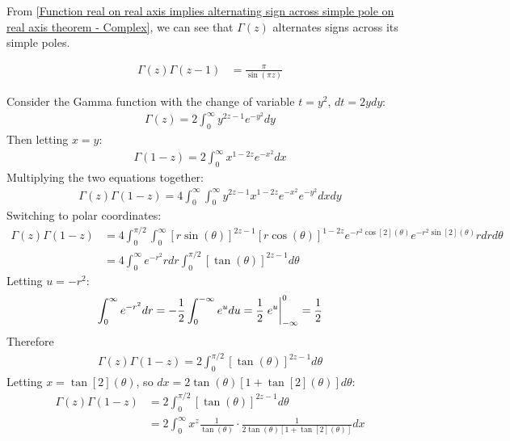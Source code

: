 \documentclass[12pt, english]{book}
\makeatletter
\renewenvironment{proof}[1][\proofname]{\par
	\pushQED{\qed}%
	\normalfont \topsep6\p@\@plus6\p@\relax
	\list{}{%
		\settowidth{\leftmargin}{\itshape\proofname:\hskip\labelsep}%
		\setlength{\labelwidth}{0pt}%
		\setlength{\itemindent}{-\leftmargin}%
	}%
	\item[\hskip\labelsep\itshape#1\@addpunct{:}]\ignorespaces
	}{ \popQED\endlist\@endpefalse}
\makeatother
\begin{document}
	From \cref{Function real on real axis implies alternating sign across simple pole on real axis theorem - Complex}, we can see that \(\Gamma(z)\) alternates signs across its simple poles.
	
	\begin{theorem}
		\label{Gamma Function Reflection Formula - Complex}
		\begin{align*}
			\Gamma(z) \Gamma(z-1) &= \frac{\pi}{\sin(\pi z)}
		\end{align*}
	\end{theorem}
	\begin{proof}
		Consider the Gamma function with the change of variable \(t = y^2\), \(dt = 2ydy\):
		\begin{align*}
			\Gamma(z) = 2 \int_{0}^{\infty} y^{2z-1} e^{-y^2} dy
		\end{align*}
		Then letting \(x = y\):
		\begin{align*}
			\Gamma(1-z) = 2 \int_{0}^{\infty} x^{1-2z} e^{-x^2} dx
		\end{align*}
		Multiplying the two equations together:
		\begin{align*}
			\Gamma(z) \Gamma(1-z)
			= 4 \int_{0}^{\infty} \int_{0}^{\infty} 
				y^{2z-1} x^{1-2z} e^{-x^2} e^{-y^2} dx dy
		\end{align*}
		Switching to polar coordinates:
		\begin{align*}
			\Gamma(z) \Gamma(1-z)
			&= 4 \int_{0}^{\pi/2} \int_{0}^{\infty} [r\sin(\theta)]^{2z-1} [r\cos(\theta)]^{1-2z} e^{-r^2 \cos[2](\theta)} e^{-r^2 \sin[2](\theta)} rdr d\theta \\
			&= 4 \int_{0}^{\infty} e^{-r^2} rdr \int_{0}^{\pi/2}[\tan(\theta)]^{2z-1} d\theta
		\end{align*}
		Letting \(u = -r^2\):
		\begin{align*}
			\int_{0}^{\infty} e^{-r^2} dr 
			= -\frac{1}{2} \int_{0}^{-\infty} e^u du
			= \frac{1}{2} \eval{e^u}_{-\infty}^{0} = \frac{1}{2}
		\end{align*}
		Therefore
		\begin{align*}
			\Gamma(z) \Gamma(1-z) = 2\int_{0}^{\pi/2} [\tan(\theta)]^{2z-1} d\theta
		\end{align*}
		Letting \(x = \tan[2](\theta)\), so \(dx = 2\tan(\theta)[1+\tan[2](\theta)] d\theta\):
		\begin{align*}
			\Gamma(z) \Gamma(1-z) 
			&= 2\int_{0}^{\pi/2} [\tan(\theta)]^{2z-1} d\theta  \\
			&= 2 \int_{0}^{\infty} x^z \frac{1}{\tan(\theta)} \cdot \frac{1}{2\tan(\theta)[1+\tan[2](\theta)]} dx \\

\end{align*}
\end{proof}
\end{document}
